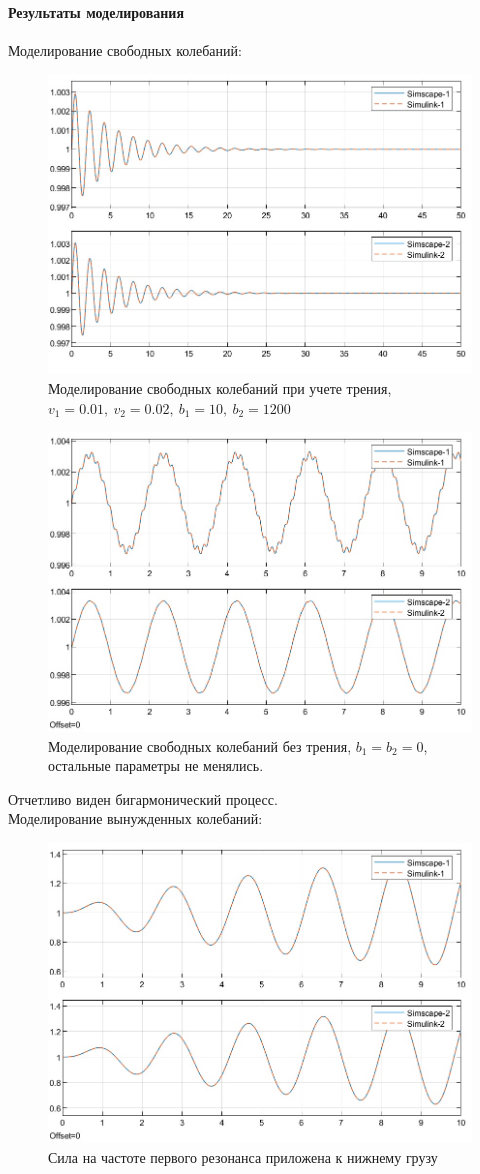 \documentclass{article}
\begin{document}
	\paragraph*{Результаты моделирования\\}
	Моделирование свободных колебаний:
	\begin{figure}[H]
		\centering
		\includegraphics[width=0.7\linewidth]{v001002}
		\caption{Моделирование свободных колебаний при учете трения, $v_1 = 0.01,\ v_2 = 0.02,\ b_1 = 10,\ b_2 = 1200$}
		\label{fig:v0}
	\end{figure}
	\begin{figure}[H]
		\centering
		\includegraphics[width=0.7\linewidth]{b=0}
		\caption{Моделирование свободных колебаний без трения, $b_1 = b_2 = 0$, остальные параметры не менялись.}
		\label{fig:b0}
	\end{figure}
	Отчетливо виден бигармонический процесс.\\
	Моделирование вынужденных колебаний:
	\begin{figure}[H]
		\centering
		\includegraphics[width=0.7\linewidth]{nizr1}
		\caption{Сила на частоте первого резонанса приложена к нижнему грузу}
		\label{fig:nizr1}
	\end{figure}
\end{document}
